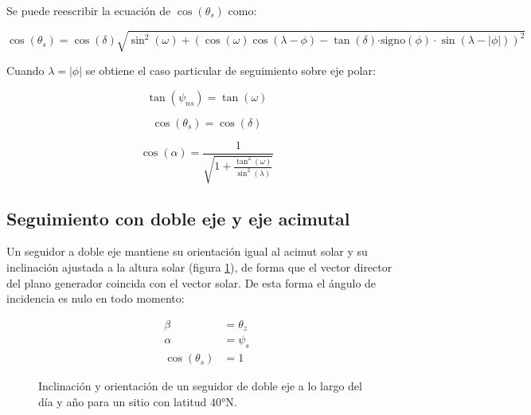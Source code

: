 Se puede reescribir la ecuación de $\cos(\theta_{s})$ como:

\begin{equation}
\cos(\theta_{s})=\cos(\delta)\sqrt{\sin^{2}(\omega)+\left(\cos(\omega)\cos(\lambda-\phi)-\tan(\delta)\mathrm{\cdot signo}(\phi)\cdot\sin(\lambda-|\phi|)\right)^{2}}\label{eq:cosThetaPolarFinal}\end{equation}


Cuando $\lambda=|\phi|$ se obtiene el caso particular de seguimiento
sobre eje polar:

\begin{equation}
\tan(\psi_{ns})=\tan(\omega)\end{equation}


\begin{equation}
\cos(\theta_{s})=\cos(\delta)\end{equation}


\begin{equation}
\cos(\alpha)=\frac{1}{\sqrt{1+\frac{\tan^{2}(\omega)}{\sin^{2}(\lambda)}}}\end{equation}



\subsection[Seguimiento doble eje]{Seguimiento con doble eje y eje acimutal}

Un seguidor a doble eje mantiene su orientación igual al acimut solar
y su inclinación ajustada a la altura solar (figura \ref{fig:AngulosDobleEje}),
de forma que el vector director del plano generador coincida con el
vector solar. De esta forma el ángulo de incidencia es nulo en todo
momento:

\begin{align}
\beta & =\theta_{z}\\
\alpha & =\psi_{s}\\
\cos(\theta_{s}) & =1\end{align}


%
\begin{figure}


\caption{Inclinación y orientación de un seguidor de doble eje a lo largo del
día y año para un sitio con latitud $\ang{40}\mathrm{N}$.\label{fig:AngulosDobleEje}}

\end{figure}


